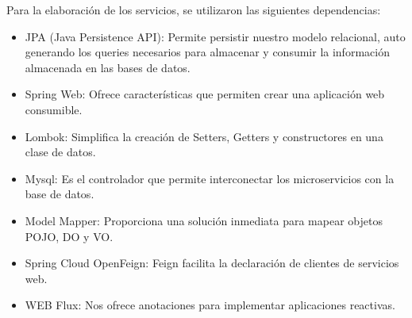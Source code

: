 Para la elaboración de los servicios, se utilizaron las siguientes dependencias:
\begin{itemize}
 \item JPA (Java Persistence API): Permite persistir nuestro modelo relacional, auto 
generando los queries necesarios para almacenar y consumir la información 
almacenada en las bases de datos.
\item Spring Web: Ofrece características que permiten crear una aplicación web 
consumible.
\item Lombok: Simplifica la creación de Setters, Getters y constructores en una clase de 
datos.

\item Mysql: Es el controlador que permite interconectar los microservicios con la 
base de datos.
\item Model Mapper: Proporciona una solución inmediata para mapear objetos POJO, 
DO y VO.
\item Spring Cloud OpenFeign: Feign facilita la declaración de clientes de servicios 
web.
\item WEB Flux: Nos ofrece anotaciones para implementar aplicaciones reactivas. 

\end{itemize}

